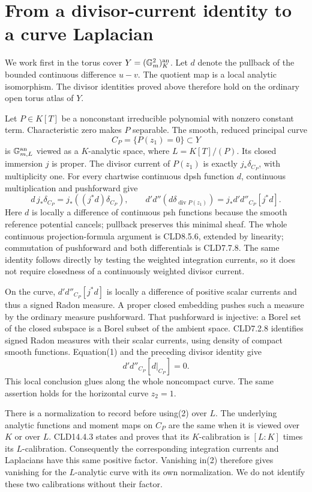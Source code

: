 \documentclass[11pt]{article}
\newcommand{\DD}{d'd''}
\begin{document}
\section{From a divisor-current identity to a curve Laplacian}
We work first in the torus cover $Y=(\mathbb G_m^2)_K^{\rm an}$.
Let $d$ denote the pullback of the bounded continuous difference $u-v$.
The quotient map is a local analytic isomorphism. The divisor identities
proved above therefore hold on the ordinary open torus atlas of $Y$.

Let $P\in K[T]$ be a nonconstant irreducible polynomial with nonzero
constant term. Characteristic zero makes $P$ separable. The smooth,
reduced principal curve
\[
 C_P=\{P(z_1)=0\}\subset Y
\]
is $\mathbb G_{m,L}^{\rm an}$ viewed as a $K$-analytic space, where
$L=K[T]/(P)$. Its closed immersion $j$ is proper. The divisor current
of $P(z_1)$ is exactly $j_*\delta_{C_P}$, with multiplicity one.
For every chartwise continuous dpsh function $d$, continuous
multiplication and pushforward give
\[
 d\,j_*\delta_{C_P}=j_*((j^*d)\delta_{C_P}),\qquad
 \DD(d\delta_{\operatorname{div}P(z_1)})
       =j_*\DD_{C_P}[j^*d].                 \tag{1}
\]
Here $d$ is locally a difference of continuous psh functions because
the smooth reference potential cancels; pullback preserves this
minimal sheaf. The whole continuous projection-formula argument is
CLD8.5.6, extended by linearity; commutation of pushforward and both
differentials is CLD7.7.8. The same identity follows directly by
testing the weighted integration currents, so it does not require
closedness of a continuously weighted divisor current.

On the curve, $\DD_{C_P}[j^*d]$ is locally a difference of positive
scalar currents and thus a signed Radon measure. A proper closed
embedding pushes such a measure by the ordinary measure pushforward.
That pushforward is injective: a Borel set of the closed subspace is
a Borel subset of the ambient space. CLD7.2.8 identifies signed
Radon measures with their scalar currents, using density of compact
smooth functions. Equation(1) and the preceding divisor identity give
\[
                    \DD_{C_P}[d|_{C_P}]=0.                 \tag{2}
\]
This local conclusion glues along the whole noncompact curve.
The same assertion holds for the horizontal curve $z_2=1$.

There is a normalization to record before using(2) over $L$.
The underlying analytic functions and moment maps on $C_P$ are the
same when it is viewed over $K$ or over $L$. CLD14.4.3 states and
proves that its $K$-calibration is $[L:K]$ times its $L$-calibration.
Consequently the corresponding integration currents and Laplacians
have this same positive factor. Vanishing in(2) therefore gives
vanishing for the $L$-analytic curve with its own normalization.
We do not identify these two calibrations without their factor.
\end{document}
